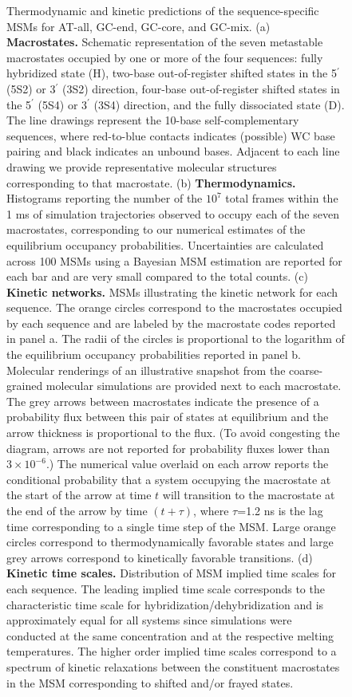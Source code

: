 \documentclass[journal=jpcbfk,manuscript=article]{achemso}
\begin{document}
\begin{figure}[ht!]
        \caption{Thermodynamic and kinetic predictions of the sequence-specific MSMs for AT-all, GC-end, GC-core, and GC-mix. (a) \textbf{Macrostates.} Schematic representation of the seven metastable macrostates occupied by one or more of the four sequences: fully hybridized state (H), two-base out-of-register shifted states in the 5$^\prime$ (5S2) or 3$^\prime$ (3S2) direction, four-base out-of-register shifted states in the 5$^\prime$ (5S4) or 3$^\prime$ (3S4) direction, and the fully dissociated state (D). The line drawings represent the 10-base self-complementary sequences, where red-to-blue contacts indicates (possible) WC base pairing and black indicates an unbound bases. Adjacent to each line drawing we provide representative molecular structures corresponding to that macrostate. (b) \textbf{Thermodynamics.} Histograms reporting the number of the $10^7$ total frames within the 1 ms of simulation trajectories observed to occupy each of the seven macrostates, corresponding to our numerical estimates of the equilibrium occupancy probabilities. Uncertainties are calculated across 100 MSMs using a Bayesian MSM estimation are reported for each bar and are very small compared to the total counts. (c) \textbf{Kinetic networks.} MSMs illustrating the kinetic network for each sequence. The orange circles correspond to the macrostates occupied by each sequence and are labeled by the macrostate codes reported in panel a. The radii of the circles is proportional to the logarithm of the equilibrium occupancy probabilities reported in panel b. Molecular renderings of an illustrative snapshot from the coarse-grained molecular simulations are provided next to each macrostate. The grey arrows between macrostates indicate the presence of a probability flux between this pair of states at equilibrium and the arrow thickness is proportional to the flux. (To avoid congesting the diagram, arrows are not reported for probability fluxes lower than $3\times10^{-6}$.) The numerical value overlaid on each arrow reports the conditional probability that a system occupying the macrostate at the start of the arrow at time $t$ will transition to the macrostate at the end of the arrow by time $(t+\tau)$, where $\tau$=1.2 ns is the lag time corresponding to a single time step of the MSM. Large orange circles correspond to thermodynamically favorable states and large grey arrows correspond to kinetically favorable transitions. (d) \textbf{Kinetic time scales.} Distribution of MSM implied time scales for each sequence. The leading implied time scale corresponds to the characteristic time scale for hybridization/dehybridization and is approximately equal for all systems since simulations were conducted at the same concentration and at the respective melting temperatures. The higher order implied time scales correspond to a spectrum of kinetic relaxations between the constituent macrostates in the MSM corresponding to shifted and/or frayed states.
    }
    \label{fig:allseq_table}
\end{figure}
\end{document}
